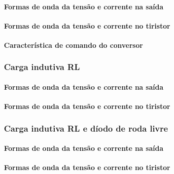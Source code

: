 \documentclass[a4paper,11pt]{article}
\numberwithin{equation}{section}
\begin{document}

\paragraph{Formas de onda da tensão e corrente na saída}



\paragraph{Formas de onda da tensão e corrente no tiristor}


\paragraph{Característica de comando do conversor}


\subsubsection{Carga indutiva RL}

\paragraph{Formas de onda da tensão e corrente na saída}


\paragraph{Formas de onda da tensão e corrente no tiristor}



\subsubsection{Carga indutiva RL e díodo de roda livre}

\paragraph{Formas de onda da tensão e corrente na saída}


\paragraph{Formas de onda da tensão e corrente no tiristor}
\end{document}
